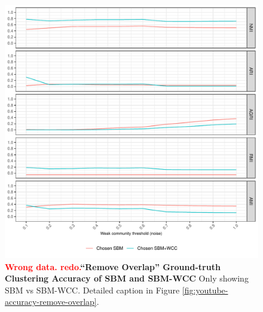 \documentclass[aps,pre,superscriptaddress]{revtex4}
\begin{document}
\begin{figure}[!htpb]
	\centering
	\includegraphics[]{figures/remove_overlap_youtube_sbm_accuracy.pdf}
	\caption[]{\textbf{\textcolor{red}{Wrong data. redo.}``Remove Overlap'' Ground-truth Clustering Accuracy of SBM and SBM-WCC} Only showing SBM vs SBM-WCC. Detailed caption in Figure \ref{fig:youtube-accuracy-remove-overlap}.}
	\label{fig:remove-overlap-sbm}
\end{figure}
\end{document}
